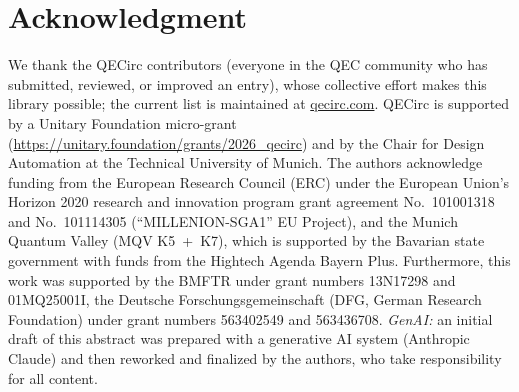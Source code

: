 \documentclass[conference]{IEEEtran}
\begin{document}
\section*{Acknowledgment}
{\scriptsize
We thank the QECirc contributors (everyone in the QEC community who has submitted, reviewed, or improved an entry), whose collective effort makes this library possible; the current list is maintained at \href{https://qecirc.com}{qecirc.com}. QECirc is supported by a Unitary Foundation micro-grant (\url{https://unitary.foundation/grants/2026_qecirc}) and by the Chair for Design Automation at the Technical University of Munich. The authors acknowledge funding from the European Research Council (ERC) under the European Union's Horizon 2020 research and innovation program grant agreement No.~101001318 and No.~101114305 (``MILLENION-SGA1'' EU Project), and the Munich Quantum Valley (MQV K5~+~K7), which is supported by the Bavarian state government with funds from the Hightech Agenda Bayern Plus. Furthermore, this work was supported by the BMFTR under grant numbers 13N17298 and 01MQ25001I, the Deutsche Forschungsgemeinschaft (DFG, German Research Foundation) under grant numbers 563402549 and 563436708. \emph{GenAI:} an initial draft of this abstract was prepared with a generative AI system (Anthropic Claude) and then reworked and finalized by the authors, who take responsibility for all content.\par
}



\end{document}
